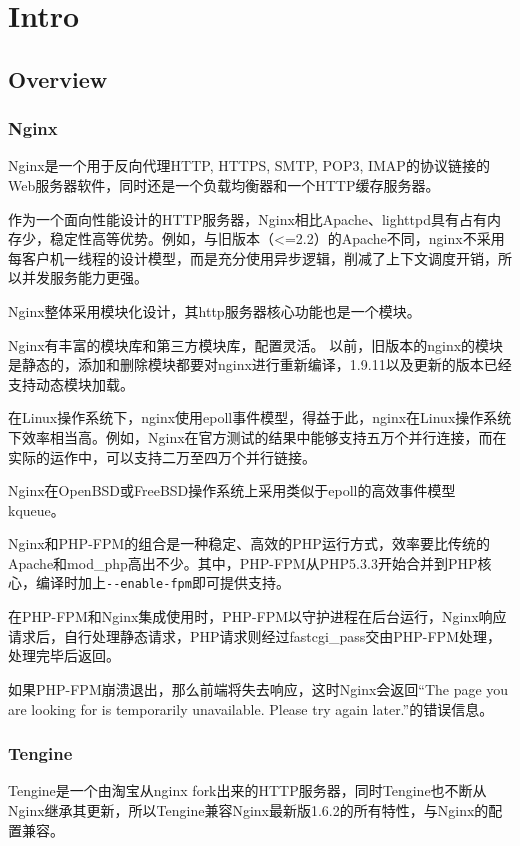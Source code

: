 \part{Intro}


\chapter{Overview}

\section{Nginx}


Nginx是一个用于反向代理HTTP, HTTPS, SMTP, POP3, IMAP的协议链接的Web服务器软件，同时还是一个负载均衡器和一个HTTP缓存服务器。


作为一个面向性能设计的HTTP服务器，Nginx相比Apache、lighttpd具有占有内存少，稳定性高等优势。例如，与旧版本（<=2.2）的Apache不同，nginx不采用每客户机一线程的设计模型，而是充分使用异步逻辑，削减了上下文调度开销，所以并发服务能力更强。

Nginx整体采用模块化设计，其http服务器核心功能也是一个模块。


Nginx有丰富的模块库和第三方模块库，配置灵活。 以前，旧版本的nginx的模块是静态的，添加和删除模块都要对nginx进行重新编译，1.9.11以及更新的版本已经支持动态模块加载。


在Linux操作系统下，nginx使用epoll事件模型，得益于此，nginx在Linux操作系统下效率相当高。例如，Nginx在官方测试的结果中能够支持五万个并行连接，而在实际的运作中，可以支持二万至四万个并行链接。


Nginx在OpenBSD或FreeBSD操作系统上采用类似于epoll的高效事件模型kqueue。

Nginx和PHP-FPM的组合是一种稳定、高效的PHP运行方式，效率要比传统的Apache和mod\_php高出不少。其中，PHP-FPM从PHP5.3.3开始合并到PHP核心，编译时加上\texttt{-\/-enable-fpm}即可提供支持。

在PHP-FPM和Nginx集成使用时，PHP-FPM以守护进程在后台运行，Nginx响应请求后，自行处理静态请求，PHP请求则经过fastcgi\_pass交由PHP-FPM处理，处理完毕后返回。

如果PHP-FPM崩溃退出，那么前端将失去响应，这时Nginx会返回“The page you are looking for is temporarily unavailable. Please try again later.”的错误信息。


\section{Tengine}

Tengine是一个由淘宝从nginx fork出来的HTTP服务器，同时Tengine也不断从Nginx继承其更新，所以Tengine兼容Nginx最新版1.6.2的所有特性，与Nginx的配置兼容。

